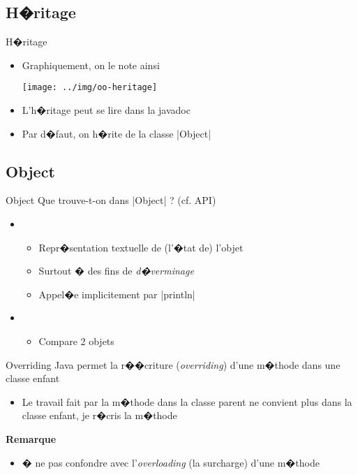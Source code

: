\subsection{H�ritage}

\begin{frame}{H�ritage}
\begin{itemize}
\item Graphiquement, on le note ainsi
\begin{center}
\texttt{[image: ../img/oo-heritage]}
\end{center}
\item L'h�ritage peut se lire dans la javadoc
\item Par d�faut, on h�rite de la classe \java|Object| 
\end{itemize} 
\end{frame}

\subsection{Object}

\begin{frame}{Object}
  Que trouve-t-on dans \java|Object| ? (cf. API)
\medskip
  \begin{itemize}
  \item {}
    \begin{itemize}
    \item Repr�sentation textuelle de (l'�tat de) l'objet
    \item Surtout � des fins de \emph{d�verminage}  
    \item Appel�e implicitement par \java|println|
    \end{itemize}
\medskip
  \item {}
    \begin{itemize}
    \item Compare 2 objets
    \end{itemize}
  \end{itemize}
\end{frame}

\begin{frame}{Overriding}
Java permet la r��criture (\emph{overriding}) d'une m�thode dans une classe enfant
\begin{itemize}
  \item Le travail fait par la m�thode dans la classe parent ne convient plus dans la classe enfant, je r�cris la m�thode
\end{itemize}
\textbf{Remarque}
\begin{itemize}
  \item � ne pas confondre avec l'\emph{overloading} (la surcharge) d'une m�thode
\end{itemize}
\end{frame}

